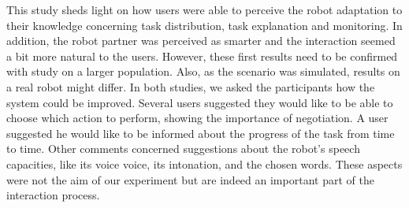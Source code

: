 This study sheds light on how users were able to perceive the robot adaptation to their knowledge concerning task distribution, task explanation and monitoring. In addition, the robot partner was perceived as smarter and the interaction seemed a bit more natural to the users. However, these first results need to be confirmed with study on a larger population. Also, as the scenario was simulated, results on a real robot might differ.
In both studies, we asked the participants how the system could be improved. Several users suggested they would like to be able to choose which action to perform, showing the importance of negotiation. A user suggested he would like to be informed about the progress of the task from time to time. Other comments concerned suggestions about the robot's speech capacities, like its voice voice, its intonation, and the chosen words. These aspects were not the aim of our  experiment but are indeed an important part of the interaction process. 

%


